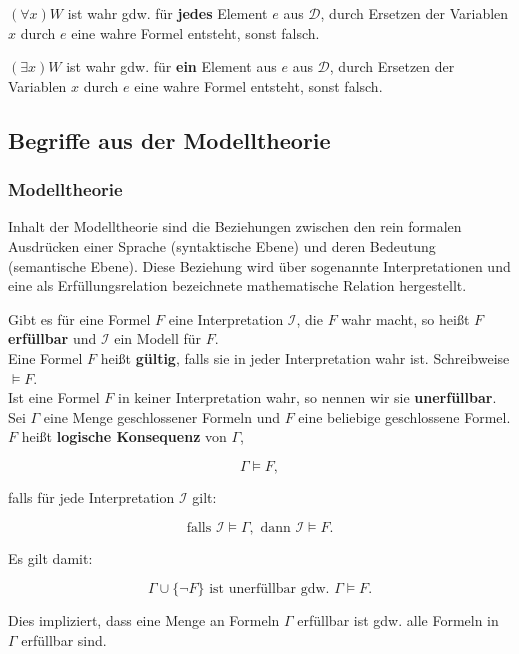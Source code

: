 \documentclass[runningheads,deutsch]{llncs}
\begin{document}
$(\forall x) W$ ist wahr gdw. für \textbf{jedes} Element $e$ aus $\mathcal{D}$, durch Ersetzen der Variablen $x$ durch $e$ eine wahre Formel entsteht, sonst falsch.

$(\exists x) W$ ist wahr gdw. für \textbf{ein} Element aus $e$ aus $\mathcal{D}$, durch Ersetzen der Variablen $x$ durch $e$ eine wahre Formel entsteht, sonst falsch.

\subsection{Begriffe aus der Modelltheorie}

\subsubsection{Modelltheorie}
Inhalt der Modelltheorie sind die Beziehungen zwischen den rein formalen Ausdrücken einer Sprache (syntaktische Ebene) und deren Bedeutung (semantische Ebene). Diese Beziehung wird über sogenannte Interpretationen und eine als Erfüllungsrelation bezeichnete mathematische Relation hergestellt.

Gibt es für eine Formel $F$ eine Interpretation $\mathcal{I}$, die $F$ wahr macht, so heißt $F$ \textbf{erfüllbar} und $\mathcal I$ ein Modell für $F$. \\

Eine Formel $F$ heißt \textbf{gültig}, falls sie in jeder Interpretation wahr ist. Schreibweise $\vDash F$. \\

Ist eine Formel $F$ in keiner Interpretation wahr, so nennen wir sie \textbf{unerfüllbar}. \\

Sei $\Gamma$ eine Menge geschlossener Formeln und $F$ eine beliebige geschlossene Formel. $F$ heißt \textbf{logische Konsequenz} von $\Gamma$,

\[
    \Gamma \vDash F,
\]

falls für jede Interpretation $\mathcal I$ gilt:

\[
    \text{falls } \mathcal I \vDash \Gamma, \text{ dann } \mathcal I \vDash F.
\]

Es gilt damit:

\[
    \Gamma \cup \{\lnot F\} \text{ ist unerfüllbar gdw. } \Gamma \vDash F.
\]

Dies impliziert, dass eine Menge an Formeln $\Gamma$ erfüllbar ist gdw. alle Formeln in $\Gamma$ erfüllbar sind.
\end{document}
